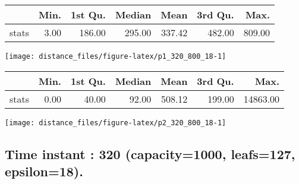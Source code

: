 \documentclass[
  9pt,
  landscape]{article}
\begin{document}
\begin{minipage}{0.5\textwidth} 
\centering 
\begin{tabular}{rrrrrrr}
  \hline
 & Min. & 1st Qu. & Median & Mean & 3rd Qu. & Max. \\ 
  \hline
stats & 3.00 & 186.00 & 295.00 & 337.42 & 482.00 & 809.00 \\ 
   \hline
\end{tabular}
\vspace{0.5cm} 


\texttt{[image: distance\_files/figure-latex/p1\_320\_800\_18-1]} 

\end{minipage} 
\begin{minipage}{0.5\textwidth} 
\centering 
\begin{tabular}{rrrrrrr}
  \hline
 & Min. & 1st Qu. & Median & Mean & 3rd Qu. & Max. \\ 
  \hline
stats & 0.00 & 40.00 & 92.00 & 508.12 & 199.00 & 14863.00 \\ 
   \hline
\end{tabular}
\vspace{0.5cm} 


\texttt{[image: distance\_files/figure-latex/p2\_320\_800\_18-1]} 

\end{minipage}

\pagebreak

\hypertarget{time-instant-320-capacity1000-leafs127-epsilon18.}{%
\subsection{Time instant : 320 (capacity=1000, leafs=127,
epsilon=18).}\label{time-instant-320-capacity1000-leafs127-epsilon18.}}
\end{document}
